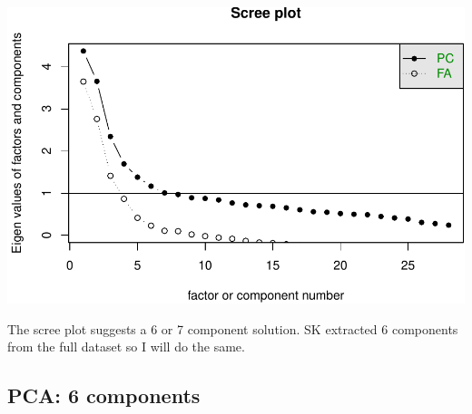 \documentclass[]{article}
\begin{document}
\includegraphics{PCA_covid_files/figure-latex/unnamed-chunk-5-1.pdf}

The scree plot suggests a 6 or 7 component solution. SK extracted 6
components from the full dataset so I will do the same.

\hypertarget{pca-6-components}{%
\subsection{PCA: 6 components}\label{pca-6-components}}
\end{document}
